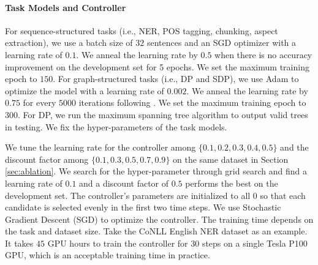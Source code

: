 \documentclass[11pt,a4paper]{article}
\begin{document}
\paragraph{Task Models and Controller}
\label{sec:models}
For sequence-structured tasks (i.e., NER, POS tagging, chunking, aspect extraction), we use a batch size of $32$ sentences and an SGD optimizer with a learning rate of $0.1$. We anneal the learning rate by $0.5$ when there is no accuracy improvement on the development set for 5 epochs. We set the maximum training epoch to $150$. For graph-structured tasks (i.e., DP and SDP), we use Adam \citep{kingma2014adam} to optimize the model with a learning rate of $0.002$. We anneal the learning rate by $0.75$ for every $5000$ iterations following \citet{dozat2016deep}. We set the maximum training epoch to $300$. For DP, we run the maximum spanning tree \cite{mcdonald-etal-2005-non} algorithm to output valid trees in testing. We fix the hyper-parameters of the task models. 

We tune the learning rate for the controller among $\{0.1,0.2,0.3,0.4,0.5\}$ and the discount factor among $\{0.1,0.3,0.5,0.7,0.9\}$ on the same dataset in Section \ref{sec:ablation}. We search for the hyper-parameter through grid search and find a learning rate of $0.1$ and a discount factor of $0.5$ performs the best on the development set. The controller's parameters are initialized to all $0$ so that each candidate is selected evenly in the first two time steps. 
We use Stochastic Gradient Descent (SGD) to optimize the controller. 
The training time depends on the task and dataset size. Take the CoNLL English NER dataset as an example. It takes $45$ GPU hours to train the controller for $30$ steps on a single Tesla P100 GPU, which is an acceptable training time in practice.
\end{document}
